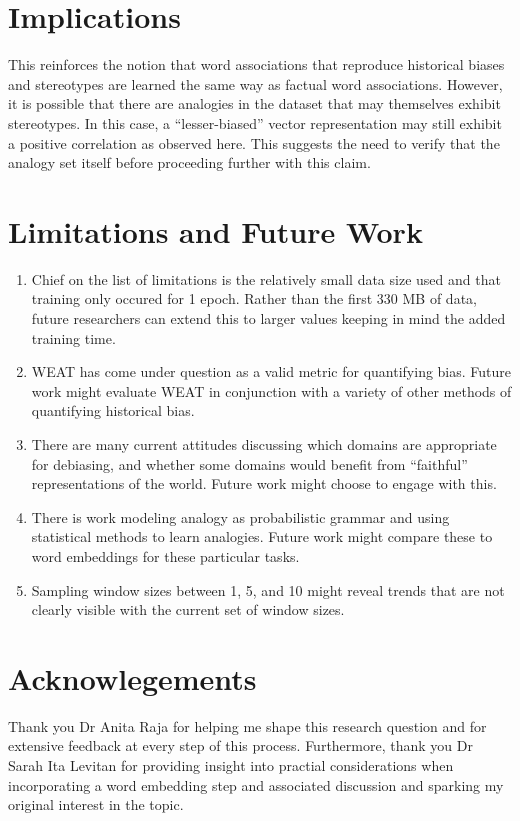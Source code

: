 \documentclass[11pt,a4paper]{article}
\begin{document}
\section{Implications}

This reinforces the notion that word associations that reproduce historical
biases and stereotypes are learned the same way as factual word associations.
However, it is possible that there are analogies in the dataset that may
themselves exhibit stereotypes. In this case, a ``lesser-biased'' vector
representation may still exhibit a positive correlation as observed here. This
suggests the need to verify that the analogy set itself before proceeding
further with this claim.

\section{Limitations and Future Work}

\begin{enumerate}

  \item Chief on the list of limitations is the relatively small data size used and that
        training only occured for 1 epoch. Rather than the first 330 MB of data, future
        researchers can extend this to larger values keeping in mind the added training
        time.

  \item WEAT has come under question as a valid metric for quantifying bias. Future work
        might evaluate WEAT in conjunction with a variety of other methods of
        quantifying historical bias.

  \item There are many current attitudes discussing which domains are appropriate for
        debiasing, and whether some domains would benefit from ``faithful''
        representations of the world. Future work might choose to engage with this.

  \item There is work modeling analogy as probabilistic grammar and using statistical
        methods to learn analogies. Future work might compare these to word embeddings
        for these particular tasks.
  \item Sampling window sizes between 1, 5, and 10 might reveal trends that are
  not clearly visible with the current set of window sizes.
\end{enumerate}

\section{Acknowlegements}

Thank you Dr Anita Raja for helping me shape this research question and for
extensive feedback at every step of this process. Furthermore, thank you Dr
Sarah Ita Levitan for providing insight into practial considerations when
incorporating a word embedding step and associated discussion and sparking my
original interest in the topic.




\end{document}

